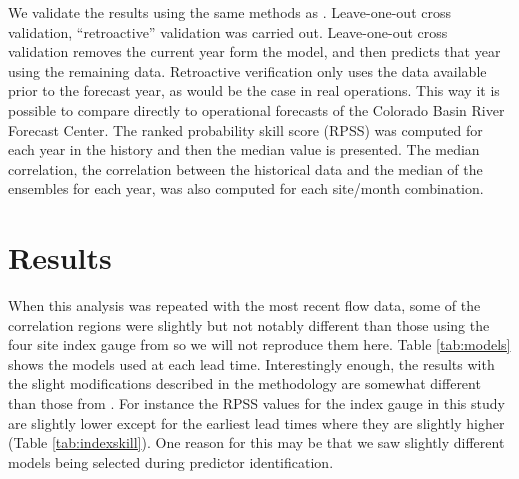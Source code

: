\documentclass[final,5p,times,twocolumn,authoryear]{elsarticle}
\begin{document}
We validate the results using the same methods as \cite{Bracken:2010cw}. Leave-one-out cross validation, ``retroactive'' validation was carried out. Leave-one-out cross validation removes the current year form the model, and then predicts that year using the remaining data. Retroactive verification only uses the data available prior to the forecast year, as would be the case in real operations. This way it is possible to compare directly to operational forecasts of the Colorado Basin River Forecast Center. The ranked probability skill score (RPSS) \cite{Wilks:1995ur} was computed for each year in the history and then the median value is presented. The median correlation, the correlation between the historical data and the median of the ensembles for each year,  was also computed for each site/month combination. 

\section{Results}

When this analysis was repeated with the most recent flow data, some of the correlation regions were slightly but not notably different than those using the four site index gauge from \cite{Bracken:2010cw} so we will not reproduce them here.  Table \ref{tab:models} shows the models used at each lead time. Interestingly enough, the results with the slight modifications described in the methodology are somewhat different than those from \cite{Bracken:2010cw}. For instance the RPSS values for the index gauge in this study are slightly lower except for the earliest lead times where they are slightly higher (Table \ref{tab:indexskill}). One reason for this may be that we saw slightly different models being selected during predictor identification.
 
\end{document}
